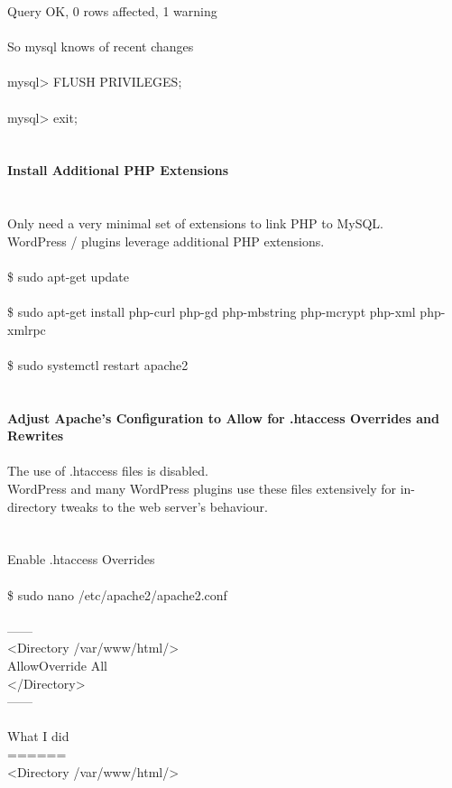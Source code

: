 \documentclass[10pt,a4paper]{article}
\begin{document}
{{{{{{{{{{{{{{{{{{Query OK, 0 rows affected, 1 warning \\
\\
So mysql knows of recent changes\\
\\
mysql> FLUSH PRIVILEGES;\\
\\
mysql> exit;\\
\\
\\
\textbf{Install Additional PHP Extensions}}{\large \\
\\
\\
Only need a very minimal set of extensions to link PHP to MySQL. \\
WordPress / plugins leverage additional PHP extensions.\\
\\
\$ sudo apt-get update\\
\\
\$ sudo apt-get install php-curl php-gd php-mbstring php-mcrypt php-xml php-xmlrpc\\
\\
\$ sudo systemctl restart apache2\\
\\
\\
\textbf{Adjust Apache's Configuration to Allow for .htaccess Overrides and Rewrites}}{\large \\
\\
The use of .htaccess files is disabled. \\
WordPress and many WordPress plugins use these files extensively for in-directory tweaks to the web server's behaviour.\\
\\
\\
Enable .htaccess Overrides\\
\\
\$ sudo nano /etc/apache2/apache2.conf}{\large \\
\\
------\\
<Directory /var/www/html/>}{\large \\
    AllowOverride All\\
</Directory>\\
------\\
\\
What I did\\
======\\
<Directory /var/www/html/>}{\large \\
}}}}}}}}}}}}}}}}}}
\end{document}
